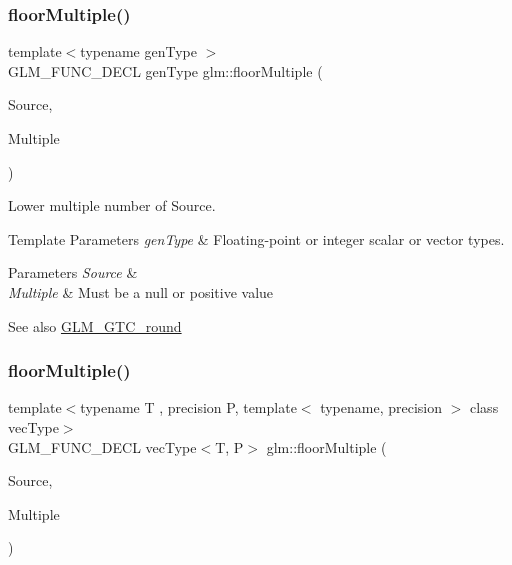 \subsubsection{\texorpdfstring{floor\+Multiple()}{floorMultiple()}\hspace{0.1cm}{\footnotesize\ttfamily [1/2]}}
{\footnotesize\ttfamily template$<$typename gen\+Type $>$ \\
G\+L\+M\+\_\+\+F\+U\+N\+C\+\_\+\+D\+E\+CL gen\+Type glm\+::floor\+Multiple (\begin{DoxyParamCaption}\item[{gen\+Type}]{Source,  }\item[{gen\+Type}]{Multiple }\end{DoxyParamCaption})}

Lower multiple number of Source.


\begin{DoxyTemplParams}{Template Parameters}
{\em gen\+Type} & Floating-\/point or integer scalar or vector types. \\
\hline
\end{DoxyTemplParams}

\begin{DoxyParams}{Parameters}
{\em Source} & \\
\hline
{\em Multiple} & Must be a null or positive value\\
\hline
\end{DoxyParams}
\begin{DoxySeeAlso}{See also}
\hyperlink{group__gtc__round}{G\+L\+M\+\_\+\+G\+T\+C\+\_\+round} 
\end{DoxySeeAlso}
\mbox{\label{group__gtc__round_ga6912db42d43873fe1dedb3aed2b7a239}} 
\subsubsection{\texorpdfstring{floor\+Multiple()}{floorMultiple()}\hspace{0.1cm}{\footnotesize\ttfamily [2/2]}}
{\footnotesize\ttfamily template$<$typename T , precision P, template$<$ typename, precision $>$ class vec\+Type$>$ \\
G\+L\+M\+\_\+\+F\+U\+N\+C\+\_\+\+D\+E\+CL vec\+Type$<$T, P$>$ glm\+::floor\+Multiple (\begin{DoxyParamCaption}\item[{vec\+Type$<$ T, P $>$ const \&}]{Source,  }\item[{vec\+Type$<$ T, P $>$ const \&}]{Multiple }\end{DoxyParamCaption})}

